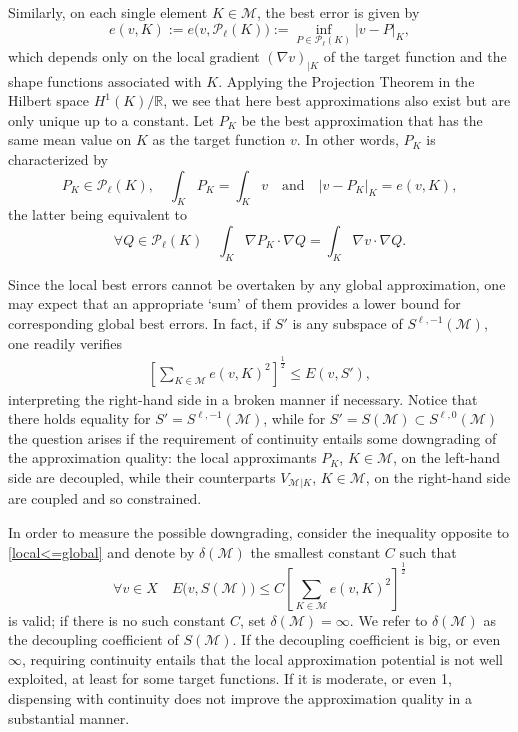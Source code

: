 \documentclass[a4paper]{amsart}
\numberwithin{equation}{section}
\theoremstyle{plain}
\theoremstyle{definition}
\begin{document}
Similarly, on each single element ${K}\in{\mathcal{M}}$, the best error is
given by
\[
 e(v,{K})
 {:=}
 e\big( v,{\mathcal{P}_{{\ell}}({{K}})} \big)
 {:=}
 \inf_{P\in{\mathcal{P}_{{\ell}}({{K}})}} {\left|{v-P}\right|_{K}},
\]
which depends only on the local gradient $({\nabla} v)_{|{K}}$ of the
target function and the shape functions associated with ${K}$.
Applying the Projection Theorem in the Hilbert space
${H^{{1}}}({K})/{\mathbb{R}}$, we see that here best approximations also exist
but are only unique up to a constant.  Let $P_{K}$ be the best
approximation that has the same mean value on ${K}$ as the target
function $v$.  In other words, $P_{K}$ is characterized by
\begin{equation}
\label{Pelm}
 P_{K}\in{\mathcal{P}_{{\ell}}({{K}})},
\quad
 \int_{K} P_{K} = \int_{K} v
\quad\text{and}\quad
 {\left|{v-P_{K}}\right|_{K}}=e(v,{K}),
\end{equation}
the latter being equivalent to
\begin{equation}
\label{Pelm:ort}
 \forall Q\in{\mathcal{P}_{{\ell}}({{K}})}
\quad
 \int_{K} {\nabla} P_{K} \cdot {\nabla} Q
 =
 \int_{K} {\nabla} v \cdot {\nabla} Q.
\end{equation}

Since the local best errors cannot be overtaken by any global approximation, 
one may expect that an appropriate `sum' of them provides a lower bound for 
corresponding global best errors.  In fact, if ${S}'$ is any subspace of 
${S}^{{\ell},-1}({\mathcal{M}})$, one readily verifies
\begin{align}
\label{local<=global}
 \left[
  \sum_{{K}\in{\mathcal{M}}} e(v,{K})^2
 \right]^{\frac12}
 \leq
  E(v,{S}'),
\end{align}
interpreting the right-hand side in a broken manner if necessary. Notice that 
there holds equality for ${S}'={S}^{{\ell},-1}({\mathcal{M}})$, while for 
${S}'={S}({\mathcal{M}})\subset{S}^{{\ell},0}({\mathcal{M}})$ the question arises 
if the requirement of continuity entails some downgrading of the approximation 
quality: the local approximants $P_{K}$, ${K}\in{\mathcal{M}}$, on the left-hand side 
are decoupled, while their counterparts $V_{\mathcal{M}}{}_{|{K}}$, ${K}\in{\mathcal{M}}$, on 
the right-hand side are coupled and so constrained.

In order to measure the possible downgrading, consider the inequality opposite 
to \eqref{local<=global} and denote by ${\delta}({\mathcal{M}})$ the smallest constant 
$C$ such that
\begin{equation}
\label{global<=Clocal}
 \forall v\in X
\quad
 E\big( v,{S}({\mathcal{M}}) \big)
 \leq
 C  \left[
  \sum_{{K}\in{\mathcal{M}}} e(v,{K})^2
 \right]^{\frac12}
\end{equation}
is valid; if there is no such constant $C$, set ${\delta}({\mathcal{M}}) = \infty$.  We 
refer to ${\delta}({\mathcal{M}})$ as the decoupling coefficient of ${S}({\mathcal{M}})$.  
If the decoupling coefficient is big, or even $\infty$, requiring continuity
entails that the local approximation potential is not well exploited, at least
for some target functions.  If it is moderate, or even 1, dispensing with 
continuity does not improve the approximation quality in a substantial manner.
\end{document}
